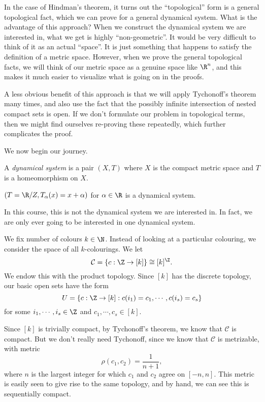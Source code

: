 \documentclass[a4paper]{article}
\begin{document}
In the case of Hindman's theorem, it turns out the ``topological'' form is a general topological fact, which we can prove for a general dynamical system. What is the advantage of this approach? When we construct the dynamical system we are interested in, what we get is highly ``non-geometric''. It would be very difficult to think of it as an actual ``space''. It is just something that happens to satisfy the definition of a metric space. However, when we prove the general topological facts, we will think of our metric space as a genuine space like $\R^n$, and this makes it much easier to visualize what is going on in the proofs.

A less obvious benefit of this approach is that we will apply Tychonoff's theorem many times, and also use the fact that the possibly infinite intersection of nested compact sets is open. If we don't formulate our problem in topological terms, then we might find ourselves re-proving these repeatedly, which further complicates the proof.

We now begin our journey.

\begin{defi}
  A \emph{dynamical system} is a pair $(X, T)$ where $X$ is the compact metric space and $T$ is a homeomorphism on $X$.
\end{defi}

\begin{eg}
  $(T = \R/Z, T_\alpha(x) = x + \alpha)$ for $\alpha \in \R$ is a dynamical system.
\end{eg}
In this course, this is not the dynamical system we are interested in. In fact, we are only ever going to be interested in one dynamical system.

We fix number of colours $k \in \N$. Instead of looking at a particular colouring, we consider the space of all $k$-colourings. We let
\[
  \mathcal{C} = \{c: \Z \to [k]\} \cong [k]^{\Z}.
\]
We endow this with the product topology. Since $[k]$ has the discrete topology, our basic open sets have the form
\[
  U = \{c: \Z \to [k] : c(i_1) = c_1, \cdots, c(i_s) = c_s\}
\]
for some $i_1, \cdots, i_s \in \Z$ and $c_1, \cdots, c_s \in [k]$.

Since $[k]$ is trivially compact, by Tychonoff's theorem, we know that $\mathcal{C}$ is compact. But we don't really need Tychonoff, since we know that $\mathcal{C}$ is metrizable, with metric
\[
  \rho(c_1, c_2) = \frac{1}{n + 1},
\]
where $n$ is the largest integer for which $c_1$ and $c_2$ agree on $[-n, n]$. This metric is easily seen to give rise to the same topology, and by hand, we can see this is sequentially compact.
\end{document}
